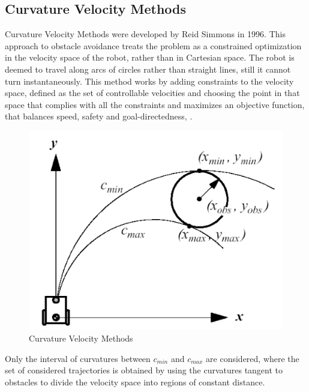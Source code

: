 \subsection{Curvature Velocity Methods}
Curvature Velocity Methods were developed by Reid Simmons in 1996.
This approach to obstacle avoidance treats the problem as a constrained optimization in the velocity space of the robot, rather than in Cartesian space.
The robot is deemed to travel along arcs of circles rather than straight lines, still it cannot turn instantaneously.
This method works by adding constraints to the velocity space, defined as the set of controllable velocities and choosing the point in that space that complies with all the constraints and maximizes an objective function, that balances speed, safety and goal-directedness, \citet{simmons}.
\begin{figure}[H]
    \centering
    \includegraphics[scale= 0.5]{Images/Chapter 4/vcm.png}
    \caption{Curvature Velocity Methods}
    \label{fig:cvm}
\end{figure}
Only the interval of curvatures between $c_{min}$ and $c_{max}$ are considered, where the set of considered trajectories is obtained by using the curvatures tangent to obstacles to divide the velocity space  into regions of constant distance.

\newpage
